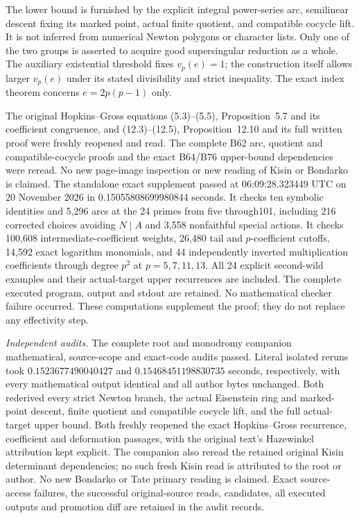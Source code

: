 \begin{remark}
\label{rem:B-RD100-scope}
The lower bound is furnished by the explicit integral
power-series arc, semilinear descent fixing its marked
point, actual finite quotient, and compatible cocycle lift.
It is not inferred from numerical Newton polygons or
character lists. Only one of the two groups is asserted
to acquire good supersingular reduction as a whole.
The auxiliary existential threshold fixes $v_p(e)=1$;
the construction itself allows larger $v_p(e)$ under
its stated divisibility and strict inequality.
The exact index theorem concerns $e=2p(p-1)$ only.

The original Hopkins--Gross equations (5.3)--(5.5),
Proposition~5.7 and its coefficient congruence, and
(12.3)--(12.5), Proposition~12.10 and its full written
proof were freshly reopened and read. The complete B62
arc, quotient and compatible-cocycle proofs and the exact
B64/B76 upper-bound dependencies were reread.
No new page-image inspection or new reading of Kisin
or Bondarko is claimed. The standalone exact supplement
passed at 06:09:28.323449 UTC on 20 November 2026 in
0.15055808699980844 seconds. It checks ten symbolic
identities and 5,296 arcs at the 24 primes from five
through101, including 216 corrected choices avoiding
$N\mid A$ and 3,558 nonfaithful special actions.
It checks 100,608 intermediate-coefficient weights,
26,480 tail and $p$-coefficient cutoffs, 14,592 exact
logarithm monomials, and 44 independently inverted
multiplication coefficients through degree $p^2$
at $p=5,7,11,13$. All 24 explicit second-wild
examples and their actual-target upper recurrences
are included. The complete executed program, output
and stdout are retained. No mathematical checker
failure occurred. These computations supplement
the proof; they do not replace any effectivity step.

\smallskip
\noindent\emph{Independent audits.}
The complete root and monodromy companion mathematical,
source-scope and exact-code audits passed. Literal isolated
reruns took \(0.1523677490040427\) and \(0.15468451198830735\) seconds, respectively,
with every mathematical output identical and all author
bytes unchanged. Both rederived every strict Newton branch,
the actual Eisenstein ring and marked-point descent,
finite quotient and compatible cocycle lift, and the
full actual-target upper bound. Both freshly reopened
the exact Hopkins--Gross recurrence, coefficient and
deformation passages, with the original text's
Hazewinkel attribution kept explicit. The companion
also reread the retained original Kisin determinant
dependencies; no such fresh Kisin read is attributed
to the root or author. No new Bondarko or Tate
primary reading is claimed. Exact source-access
failures, the successful original-source reads,
candidates, all executed outputs and promotion
diff are retained in the audit records.
\end{remark}
